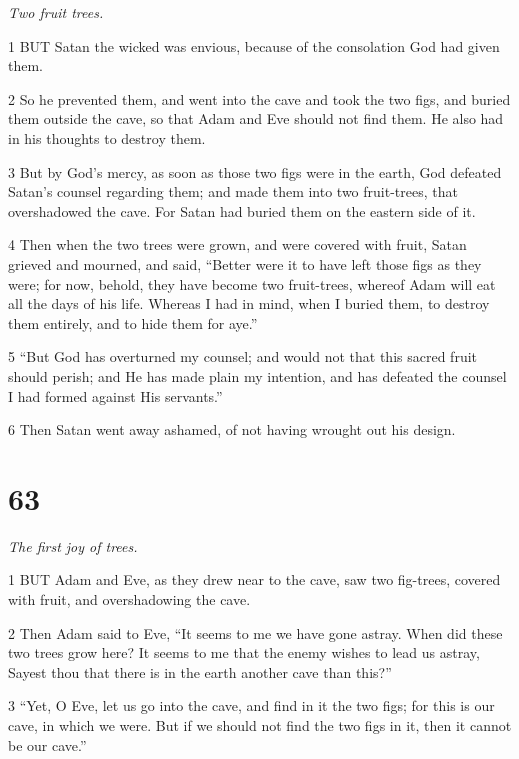 \par \textit{Two fruit trees.}

\par 1 BUT Satan the wicked was envious, because of the consolation God had given them.

\par 2 So he prevented them, and went into the cave and took the two figs, and buried them outside the cave, so that Adam and Eve should not find them. He also had in his thoughts to destroy them.

\par 3 But by God's mercy, as soon as those two figs were in the earth, God defeated Satan's counsel regarding them; and made them into two fruit-trees, that overshadowed the cave. For Satan had buried them on the eastern side of it.

\par 4 Then when the two trees were grown, and were covered with fruit, Satan grieved and mourned, and said, “Better were it to have left those figs as they were; for now, behold, they have become two fruit-trees, whereof Adam will eat all the days of his life. Whereas I had in mind, when I buried them, to destroy them entirely, and to hide them for aye.”

\par 5 “But God has overturned my counsel; and would not that this sacred fruit should perish; and He has made plain my intention, and has defeated the counsel I had formed against His servants.”

\par 6 Then Satan went away ashamed, of not having wrought out his design.

\chapter{63}

\par \textit{The first joy of trees.}

\par 1 BUT Adam and Eve, as they drew near to the cave, saw two fig-trees, covered with fruit, and overshadowing the cave.

\par 2 Then Adam said to Eve, “It seems to me we have gone astray. When did these two trees grow here? It seems to me that the enemy wishes to lead us astray, Sayest thou that there is in the earth another cave than this?”

\par 3 “Yet, O Eve, let us go into the cave, and find in it the two figs; for this is our cave, in which we were. But if we should not find the two figs in it, then it cannot be our cave.”

